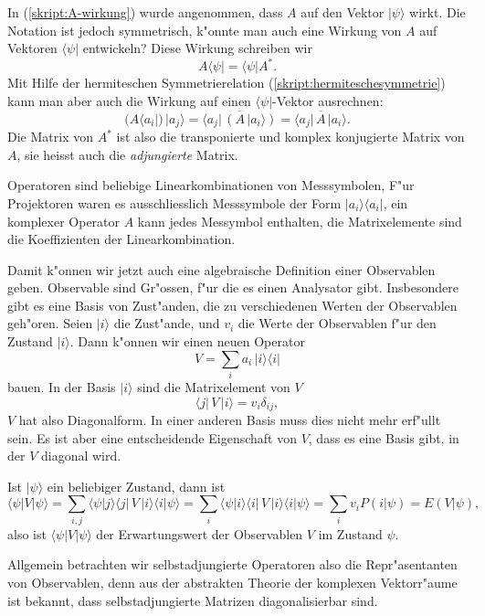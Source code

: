 In (\ref{skript:A-wirkung}) wurde angenommen, dass $A$ auf den Vektor
$|\psi\rangle$ wirkt. Die Notation ist jedoch symmetrisch, k"onnte
man auch eine Wirkung von $A$ auf Vektoren $\langle\psi|$ entwickeln?
Diese Wirkung schreiben wir
\[
A\langle \psi|=\langle\psi|A^*.
\]
Mit Hilfe der hermiteschen Symmetrierelation (\ref{skript:hermiteschesymmetrie})
kann man aber auch die Wirkung auf einen $\langle\psi|$-Vektor ausrechnen:
\begin{equation}
(A\langle a_i|)\,|a_j\rangle
=
\overline{\langle a_j|\,(A\,|a_i\rangle)}
=
\overline{\langle a_j|\,A\,|a_i\rangle}.
\end{equation}
Die Matrix von $A^*$
ist also die transponierte und komplex konjugierte Matrix von $A$,
sie heisst auch die {\em adjungierte} Matrix.

Operatoren sind beliebige Linearkombinationen von Messsymbolen,
F"ur Projektoren waren es ausschliesslich Messsymbole der Form
$|a_i\rangle\langle a_i|$, ein komplexer Operator $A$ kann jedes
Messymbol enthalten, die Matrixelemente sind die Koeffizienten 
der Linearkombination.

Damit k"onnen wir jetzt auch eine algebraische Definition einer
Observablen geben. Observable sind Gr"ossen, f"ur die es einen
Analysator gibt. Insbesondere gibt es eine Basis von Zust"anden,
die zu verschiedenen Werten der Observablen geh"oren.
Seien $|i\rangle$ die Zust"ande, und $v_i$ die Werte der Observablen
f"ur den Zustand $|i\rangle$. Dann k"onnen wir einen neuen
Operator
\[
V = \sum_{i} a_i\, |i\rangle\langle i|
\]
bauen. In der Basis $|i\rangle$ sind die Matrixelement von $V$
\[
\langle j|\,V\,|i\rangle = v_i\delta_{ij},
\]
$V$ hat also Diagonalform. In einer anderen Basis muss dies nicht
mehr erf"ullt sein. Es ist aber eine entscheidende Eigenschaft 
von $V$, dass es eine Basis gibt, in der $V$ diagonal wird.

Ist $|\psi\rangle$ ein beliebiger Zustand, dann ist
\[
\langle\psi|V|\psi\rangle
=
\sum_{i,j}\langle \psi|j\rangle\langle j|\,V\,|i\rangle\langle i|\psi\rangle
=
\sum_i\langle \psi|i\rangle\langle i|\,V\,|i\rangle\langle i|\psi\rangle
=
\sum_i v_i P(i|\psi)=E(V|\psi),
\]
also ist $\langle \psi|V|\psi\rangle$ der Erwartungswert der Observablen
$V$ im Zustand $\psi$.

Allgemein betrachten wir selbstadjungierte Operatoren also 
die Repr"asentanten von Observablen, denn aus der abstrakten
Theorie der komplexen Vektorr"aume ist bekannt, dass selbstadjungierte
Matrizen diagonalisierbar sind.

